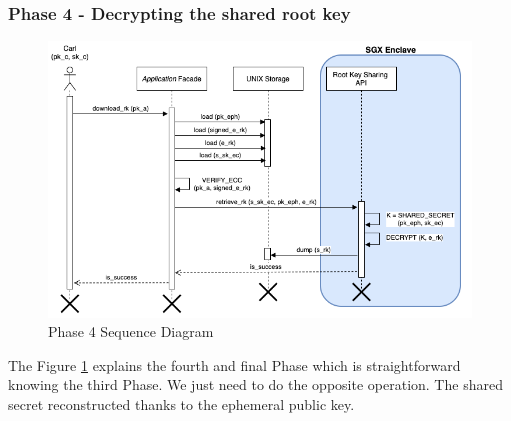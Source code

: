 \documentclass[../main.tex]{subfiles}
\begin{document}
\subsubsection{Phase 4 - Decrypting the shared root key}
\begin{figure}[ht]
    \centering
    \includegraphics[width=\textwidth]{../../images/lauxus/download_rk}
    
    \caption{Phase 4 Sequence Diagram}
    \label{figure:lauxus:download_rk}
\end{figure}
\par The Figure \ref{figure:lauxus:download_rk} explains the fourth and final Phase which is straightforward knowing the third Phase. We just need to do the opposite operation. The shared secret reconstructed thanks to the ephemeral public key.



\end{document}
